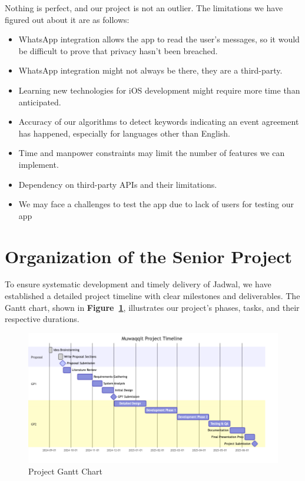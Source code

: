 \documentclass[12pt,a4paper]{report}
\begin{document}
Nothing is perfect, and our project is not an outlier. The limitations we have figured out about it are as follows:
\begin{itemize}
    \item WhatsApp integration allows the app to read the user's messages, so it would be difficult to prove that privacy hasn't been breached.
    \item WhatsApp integration might not always be there, they are a third-party.
    \item Learning new technologies for iOS development might require more time than anticipated.
    \item Accuracy of our algorithms to detect keywords indicating an event agreement has happened, especially for languages other than English.
    \item Time and manpower constraints may limit the number of features we can implement.
    \item Dependency on third-party APIs and their limitations.
    \item We may face a challenges to test the app due to lack of users for testing our app
\end{itemize}

\section{Organization of the Senior Project}

To ensure systematic development and timely delivery of Jadwal, we have established a detailed project timeline with clear milestones and deliverables. The Gantt chart, shown in \textbf{Figure~\ref{fig:project-gantt-chart}}, illustrates our project's phases, tasks, and their respective durations.

\begin{figure}[!h]
    \centering
    \includegraphics[width=\textwidth]{images/gantt.png}
    \caption{Project Gantt Chart}
    \label{fig:project-gantt-chart}
\end{figure}
\end{document}
